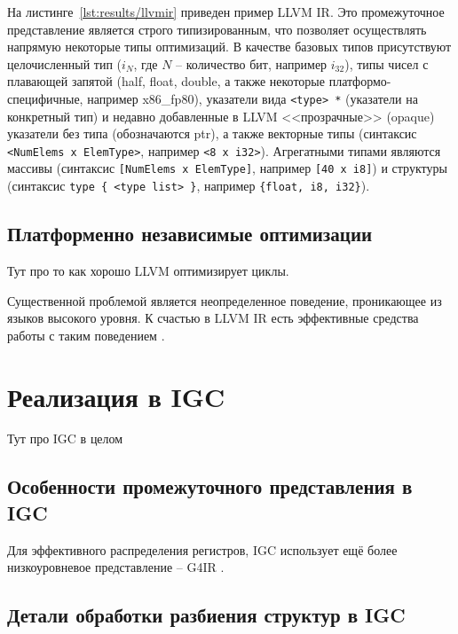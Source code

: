 На листинге~\cref{lst:results/llvmir} приведен пример LLVM IR. Это промежуточное представление является строго типизированным, что позволяет осуществлять напрямую некоторые типы оптимизаций. В качестве базовых типов присутствуют целочисленный тип ($i_N$, где $N$ -- количество бит, например $i_32$), типы чисел с плавающей запятой (half, float, double, а также некоторые платформо-специфичные, например x86\_fp80), указатели вида \lstinline!<type> *! (указатели на конкретный тип) и недавно добавленные в LLVM <<прозрачные>> (opaque) указатели без типа (обозначаются ptr), а также векторные типы (синтаксис \lstinline!<NumElems x ElemType>!, например \lstinline!<8 x i32>!). Агрегатными типами являются массивы (синтаксис \lstinline![NumElems x ElemType]!, например \lstinline![40 x i8]!) и структуры (синтаксис \lstinline!type { <type list> }!, например \lstinline!{float, i8, i32}!).

\subsection{Платформенно независимые оптимизации}\label{subsec:results/llvm/opts}

Тут про то как хорошо LLVM оптимизирует циклы.
\cite{sarkar2000optimized}

Существенной проблемой является неопределенное поведение, проникающее из языков высокого уровня. К счастью в LLVM IR есть эффективные средства работы с таким поведением \cite{lee2017taming}.

\section{Реализация в IGC}\label{sec:results/igc}

Тут про IGC в целом

\subsection{Особенности промежуточного представления в IGC}\label{subsec:results/igc/ir}

Для эффективного распределения регистров, IGC использует ещё более низкоуровневое представление -- G4IR \cite{chen2018register}.

\subsection{Детали обработки разбиения структур в IGC}\label{subsec:results/igc/splitted}

